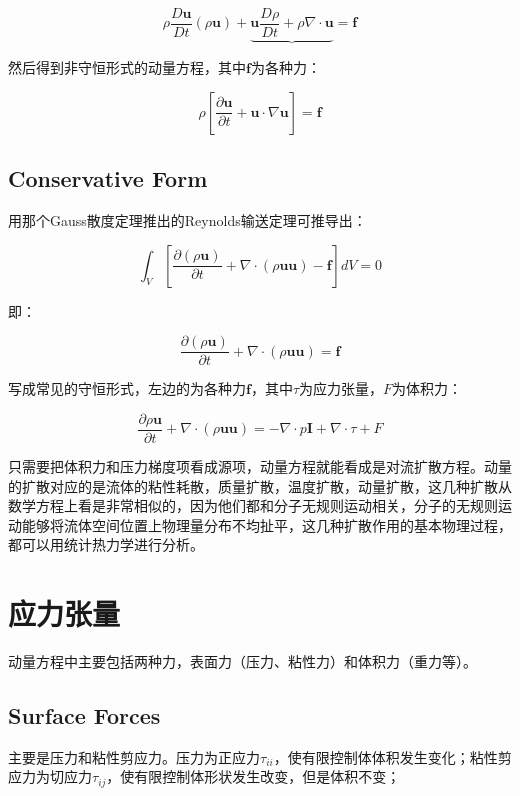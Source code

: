 \begin{equation}
\rho\frac{D\bm{u}}{Dt}(\rho\bm{u}) + \underbrace{ \bm{u}\frac{D\rho}{Dt} + \rho\nabla\cdot\bm{u} } = \bm{f}
\end{equation}

然后得到非守恒形式的动量方程，其中$ \bm{f} $为各种力：

\begin{equation}
\rho\left[ \frac{\partial \bm{u}}{\partial t} + \bm{u}\cdot\nabla\bm{u} \right] = \bm{f}
\end{equation}

\subsection{Conservative Form}
用那个Gauss散度定理推出的Reynolds输送定理可推导出：

\begin{equation}
\int_{V}\left[ \frac{\partial(\rho\bm{u})}{\partial t} + \nabla\cdot(\rho\bm{uu}) - \bm{f} \right]dV = 0
\end{equation}

即：

\begin{equation}
\frac{\partial(\rho\bm{u})}{\partial t} + \nabla\cdot(\rho\bm{uu}) = \bm{f}
\end{equation}

写成常见的守恒形式，左边的为各种力$ \bm{f} $，其中$ \tau $为应力张量，$ F $为体积力：

\begin{equation}
\frac{\partial \rho\bm{u}}{\partial t} + \nabla\cdot(\rho\bm{uu}) = -\nabla\cdot p\bm{I} + \nabla\cdot\tau + F
\end{equation}

只需要把体积力和压力梯度项看成源项，动量方程就能看成是对流扩散方程。动量的扩散对应的是流体的粘性耗散，质量扩散，温度扩散，动量扩散，这几种扩散从数学方程上看是非常相似的，因为他们都和分子无规则运动相关，分子的无规则运动能够将流体空间位置上物理量分布不均扯平，这几种扩散作用的基本物理过程，都可以用统计热力学进行分析。

\section{应力张量}
动量方程中主要包括两种力，表面力（压力、粘性力）和体积力（重力等）。

\subsection{Surface Forces}
主要是压力和粘性剪应力。压力为正应力$ \tau_{ii} $，使有限控制体体积发生变化；粘性剪应力为切应力$ \tau_{ij} $，使有限控制体形状发生改变，但是体积不变；

